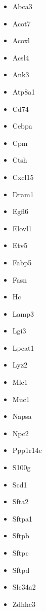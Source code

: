 \documentclass[aps,superscriptaddress, notitlepage,longbibliography]{revtex4-1}
\begin{document}
\begin{itemize}
    \item Abca3
    \item Acot7
    \item Acoxl
    \item Acsl4
    \item Ank3
    \item Atp8a1
    \item Cd74
    \item Cebpa
    \item Cpm
    \item Ctsh
    \item Cxcl15
    \item Dram1
    \item Egfl6
    \item Elovl1
    \item Etv5
    \item Fabp5
    \item Fasn
    \item Hc
    \item Lamp3
    \item Lgi3
    \item Lpcat1
    \item Lyz2
    \item Mlc1
    \item Muc1
    \item Napsa
    \item Npc2
    \item Ppp1r14c
    \item S100g
    \item Scd1
    \item Sfta2
    \item Sftpa1
    \item Sftpb
    \item Sftpc
    \item Sftpd
    \item Slc34a2
    \item Zdhhc3
\end{itemize}
\end{document}

